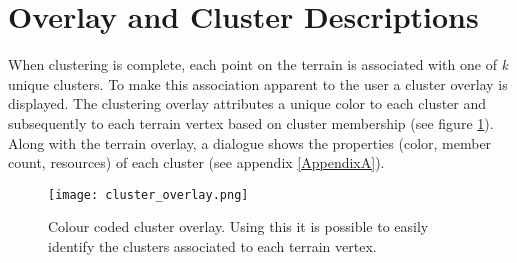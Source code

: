 \section{Overlay and Cluster Descriptions}

When clustering is complete, each point on the terrain is associated with one of \textit{k} unique clusters. To make this association apparent to the user a cluster overlay is displayed. The clustering overlay attributes a unique color to each cluster and subsequently to each terrain vertex based on cluster membership (see figure \ref{fig:cluster_overlay}). Along with the terrain overlay, a dialogue shows the properties (color, member count, resources) of each cluster (see appendix \ref{AppendixA}).

\begin{figure}
\center
	\texttt{[image: cluster\_overlay.png]}
	\caption{ Colour coded cluster overlay. Using this it is possible to easily identify the clusters associated to each terrain vertex.}	
	\label{fig:cluster_overlay}
\end{figure}
